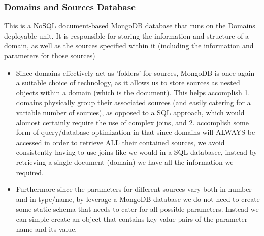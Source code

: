 \documentclass[12pt]{article}
\begin{document}
\subsubsection{Domains and Sources Database}
This is a NoSQL document-based MongoDB database that runs on the Domains deployable unit. It is responsible for storing the information and structure of a domain, as well as the sources specified within it (including the information and parameters for those sources)
\begin{itemize}
    \item Since domains effectively act as 'folders' for sources, MongoDB is once again a suitable choice of technology, as it allows us to store sources as nested objects within a domain (which is the document). This helps accomplish 1. domains physically group their associated sources (and easily catering for a variable number of sources), as opposed to a SQL approach, which would alomost certainly require the use of complex joins, and 2. accomplish some form of query/database optimization in that since domains will ALWAYS be accessed in order to retrieve ALL their contained sources, we avoid consistently having to use joins like we would in a SQL databasee, instead by retrieving a single document (domain) we have all the information we required.
    \item Furthermore since the parameters for different sources vary both in number and in type/name, by leverage a MongoDB database we do not need to create some static schema that needs to cater for all possible parameters. Instead we can simple create an object that contains key value pairs of the parameter name and its value.
\end{itemize}
\end{document}
